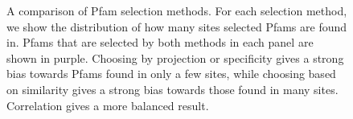 \begin{figure}
\centering
 \caption{A comparison of Pfam selection methods.  For each selection method, we show the distribution of how many sites selected Pfams are found in.  Pfams that are selected by both methods in each panel are shown in purple.  Choosing by projection or specificity gives a strong bias towards Pfams found in only a few sites, while choosing based on similarity gives a strong bias towards those found in many sites.  Correlation gives a more balanced result.}

 \label{sitedist}
\end{figure}

